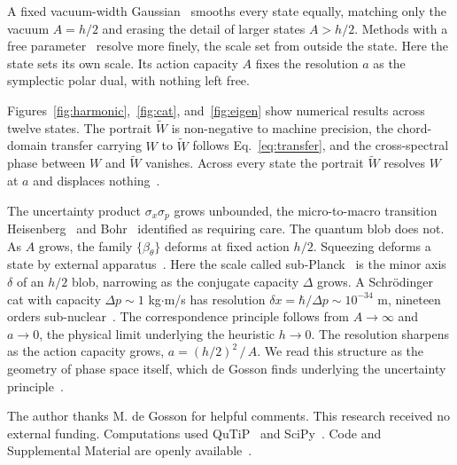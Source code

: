 \documentclass[aps,prl,reprint,amsmath,amssymb,floatfix,nofootinbib]{revtex4-2}
\begin{document}
A fixed vacuum-width Gaussian~\cite{husimi1940} smooths every state equally, matching only the vacuum $A = h/2$ and erasing the detail of larger states $A > h/2$. Methods with a free parameter~\cite{wodkiewicz1984,appleby1998husimi,cahillglauber1969} resolve more finely, the scale set from outside the state. Here the state sets its own scale. Its action capacity $A$ fixes the resolution $a$ as the symplectic polar dual, with nothing left free.

Figures~\ref{fig:harmonic},~\ref{fig:cat}, and~\ref{fig:eigen} show numerical results across twelve states. The portrait $\widetilde W$ is non-negative to machine precision, the chord-domain transfer carrying $W$ to $\widetilde W$ follows Eq.~\eqref{eq:transfer}, and the cross-spectral phase between $W$ and $\widetilde W$ vanishes. Across every state the portrait $\widetilde W$ resolves $W$ at $a$ and displaces nothing~\cite{zenododeposit}.

The uncertainty product $\sigma_x \sigma_p$ grows unbounded, the micro-to-macro transition Heisenberg~\cite{heisenberg1927} and Bohr~\cite{bohr1928} identified as requiring care. The quantum blob does not. As $A$ grows, the family $\{\beta_\theta\}$ deforms at fixed action $h/2$. Squeezing deforms a state by external apparatus~\cite{walls1983}. Here the scale called sub-Planck~\cite{zurek2001} is the minor axis $\delta$ of an $h/2$ blob, narrowing as the conjugate capacity $\Delta$ grows. A Schr\"odinger cat with capacity $\Delta p \sim 1$ kg$\cdot$m/s has resolution $\delta x = \hbar/\Delta p \sim 10^{-34}$ m, nineteen orders sub-nuclear~\cite{schrodinger1935trimmer}. The correspondence principle follows from $A \to \infty$ and $a \to 0$, the physical limit underlying the heuristic $h \to 0$. The resolution sharpens as the action capacity grows, $a = (h/2)^2 \,/ \,A$. We read this structure as the geometry of phase space itself, which de Gosson finds underlying the uncertainty principle~\cite{degossonluef2009irruption}.

\begin{acknowledgments}
The author thanks M. de Gosson for helpful comments. This research received no external funding. Computations used QuTiP~\cite{qutip5} and SciPy~\cite{scipy}. Code and Supplemental Material are openly available~\cite{zenododeposit}.
\end{acknowledgments}


\end{document}
